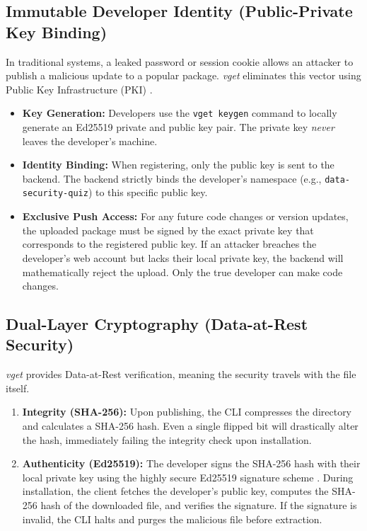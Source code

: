 \documentclass[conference]{IEEEtran}
\begin{document}
\subsection{Immutable Developer Identity (Public-Private Key Binding)}
In traditional systems, a leaked password or session cookie allows an attacker to publish a malicious update to a popular package. \textit{vget} eliminates this vector using Public Key Infrastructure (PKI) \cite{samuel2010survivable}.
\begin{itemize}
    \item \textbf{Key Generation:} Developers use the \texttt{vget keygen} command to locally generate an Ed25519 private and public key pair. The private key \textit{never} leaves the developer's machine.
    \item \textbf{Identity Binding:} When registering, only the public key is sent to the backend. The backend strictly binds the developer's namespace (e.g., \texttt{data-security-quiz}) to this specific public key.
    \item \textbf{Exclusive Push Access:} For any future code changes or version updates, the uploaded package must be signed by the exact private key that corresponds to the registered public key. If an attacker breaches the developer's web account but lacks their local private key, the backend will mathematically reject the upload. Only the true developer can make code changes.
\end{itemize}

\subsection{Dual-Layer Cryptography (Data-at-Rest Security)}
\textit{vget} provides Data-at-Rest verification, meaning the security travels with the file itself.
\begin{enumerate}
    \item \textbf{Integrity (SHA-256):} Upon publishing, the CLI compresses the directory and calculates a SHA-256 hash. Even a single flipped bit will drastically alter the hash, immediately failing the integrity check upon installation.
    \item \textbf{Authenticity (Ed25519):} The developer signs the SHA-256 hash with their local private key using the highly secure Ed25519 signature scheme \cite{bernstein2012high}. During installation, the client fetches the developer's public key, computes the SHA-256 hash of the downloaded file, and verifies the signature. If the signature is invalid, the CLI halts and purges the malicious file before extraction.
\end{enumerate}
\end{document}
